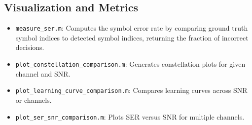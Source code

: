 \documentclass[12pt]{article}
\begin{document}
\subsection*{Visualization and Metrics}
\begin{itemize}
\item \texttt{measure\_ser.m}: Computes the symbol error rate by comparing ground truth symbol indices to detected symbol indices, returning the fraction of incorrect decisions.
\item \texttt{plot\_constellation\_comparison.m}: Generates constellation plots for given channel and SNR.
\item \texttt{plot\_learning\_curve\_comparison.m}: Compares learning curves across SNR or channels.
\item \texttt{plot\_ser\_snr\_comparison.m}: Plots SER versus SNR for multiple channels.
\end{itemize}
\end{document}
